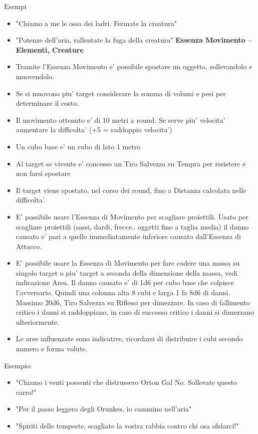 \documentclass[a4paper,11pt,twoside,openany]{book}
\begin{document}
Esempi
\begin{itemize}
	\item 
	"Chiamo a me le ossa dei ladri. Fermate la creatura"
	\item 
	"Potenze dell'aria, rallentate la fuga della creatura" 
	\textbf{Essenza Movimento -- Elementi, Creature}
	\item 
	Tramite l'Essenza Movimento e' possibile spostare un oggetto, sollevandolo e muovendolo. 
	\item 
	Se si muovono piu' target considerare la somma di volumi e pesi per determinare il costo. 
	\item 
	Il movimento ottenuto e' di 10 metri a round. Se serve piu' velocita' aumentare la difficolta' (+5 = raddoppio velocita') 
	\item 
	Un cubo base e' un cubo di lato 1 metro 
	\item 
	Al target se vivente e' concesso un Tiro Salvezza su Tempra per resistere e non farsi spostare 
	\item 
	Il target viene spostato, nel corso dei round, fino a Distanza calcolata nelle difficolta'. 
	\item 
	E' possibile usare l'Essenza di Movimento per scagliare proiettili. Usato per scagliare proiettili (sassi, dardi, frecce.. oggetti fino a taglia media) il danno causato e' pari a quello immediatamente inferiore causato dall'Essenza di Attacco. 
	\item 
	E' possibile usare la Essenza di Movimento per fare cadere una massa su singolo target o piu' target a seconda della dimensione della massa, vedi indicazione Area. Il danno causato e' di 1d6 per cubo base che colpisce l'avversario. Quindi una colonna alta 8 cubi e larga 1 fa 8d6 di danni. Massimo 20d6, Tiro Salvezza su Riflessi per dimezzare. In caso di fallimento critico i danni si raddoppiano, in caso di successo critico i danni si dimezzano ulteriormente. 
	\item 
	Le aree influenzate sono indicative, ricordarsi di distribuire i cubi secondo numero e forma volute. 
\end{itemize}
\bigskip


Esempio:
\begin{itemize}
\item 
"Chiamo i venti possenti che distrussero Orton Gal No. Sollevate questo carro!" 
\item 
"Per il passo leggero degli Orunkes, io cammino nell'aria"
\item 
"Spiriti delle tempeste, scagliate la vostra rabbia contro chi osa sfidarci!" 
\end{itemize}
\end{document}

